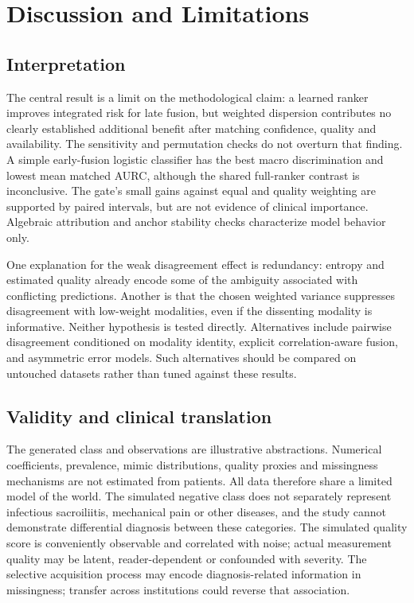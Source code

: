 \documentclass[conference]{IEEEtran}
\begin{document}
\section{Discussion and Limitations}
\subsection{Interpretation}
The central result is a limit on the methodological claim: a learned ranker improves integrated risk for late fusion, but weighted dispersion contributes no clearly established additional benefit after matching confidence, quality and availability. The sensitivity and permutation checks do not overturn that finding. A simple early-fusion logistic classifier has the best macro discrimination and lowest mean matched AURC, although the shared full-ranker contrast is inconclusive. The gate's small gains against equal and quality weighting are supported by paired intervals, but are not evidence of clinical importance. Algebraic attribution and anchor stability checks characterize model behavior only.

One explanation for the weak disagreement effect is redundancy: entropy and estimated quality already encode some of the ambiguity associated with conflicting predictions. Another is that the chosen weighted variance suppresses disagreement with low-weight modalities, even if the dissenting modality is informative. Neither hypothesis is tested directly. Alternatives include pairwise disagreement conditioned on modality identity, explicit correlation-aware fusion, and asymmetric error models. Such alternatives should be compared on untouched datasets rather than tuned against these results.
\subsection{Validity and clinical translation}
The generated class and observations are illustrative abstractions. Numerical coefficients, prevalence, mimic distributions, quality proxies and missingness mechanisms are not estimated from patients. All data therefore share a limited model of the world. The simulated negative class does not separately represent infectious sacroiliitis, mechanical pain or other diseases, and the study cannot demonstrate differential diagnosis between these categories. The simulated quality score is conveniently observable and correlated with noise; actual measurement quality may be latent, reader-dependent or confounded with severity. The selective acquisition process may encode diagnosis-related information in missingness; transfer across institutions could reverse that association.
\end{document}
